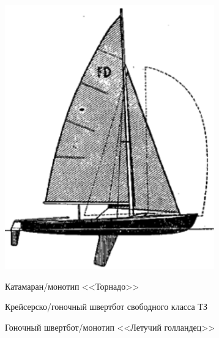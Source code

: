 \documentclass[a4paper, 12pt, twoside, final]{scrbook}
\begin{document}
\begin{figure}[htbp]
	\hfill{}\includegraphics[scale=0.7]{Gonochnyj_shvertbot-monotip_Letuchij_Gollandets}%
	\hfill{}
	\par%
	\hfill{}%
	\begin{minipage}[t]{0.3\columnwidth}%
		\protect\caption{\label{fig:16}Катамаран\-/монотип <<Торнадо>>}%
	\end{minipage}%
	\hfill{}%
	\begin{minipage}[t]{0.3\columnwidth}%
		\protect\caption{\label{fig:17}Крейсерско\-/гоночный швертбот свободного класса ТЗ}%
	\end{minipage}%
	\hfill{}%
	\begin{minipage}[t]{0.3\columnwidth}%
		\protect\caption{\label{fig:19}Гоночный швертбот\-/монотип <<Летучий голландец>>}%
	\end{minipage}%
	\hfill{}


\end{figure}
\end{document}
